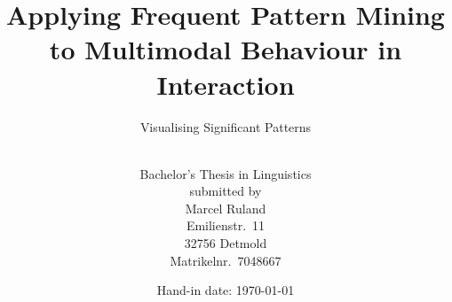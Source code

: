 \documentclass[
	DIV=calc,				%
	BCOR=0mm,				%
	pagesize,				%
	toc=bib,				%
	toc=listof,				%
	abstract=true,			%
	twoside,				%
	titlepage=firstiscover,	%
	footnotes=multiple		%
]{scrreprt}
\title{%
	{Applying Frequent Pattern Mining to Multimodal Behaviour in Interaction}
}
\subtitle{Visualising Significant Patterns}
\author{~\\[1em]
	{Bachelor's Thesis in Linguistics} \\
	submitted by \\[0.2em]
	{\LARGE\addfontfeature{Style=Alternate} Marcel Ruland} \\[0.2em]
	Emilienstr.~11 \\
	32756 Detmold \\
	Matrikelnr.~7048667
}
\date{Hand-in date: \today}
\begin{document}
{\singlespacing
\maketitle
%
\tableofcontents}






\appendix


\listoftables
\listoffigures
\singlespacing

\end{document}
